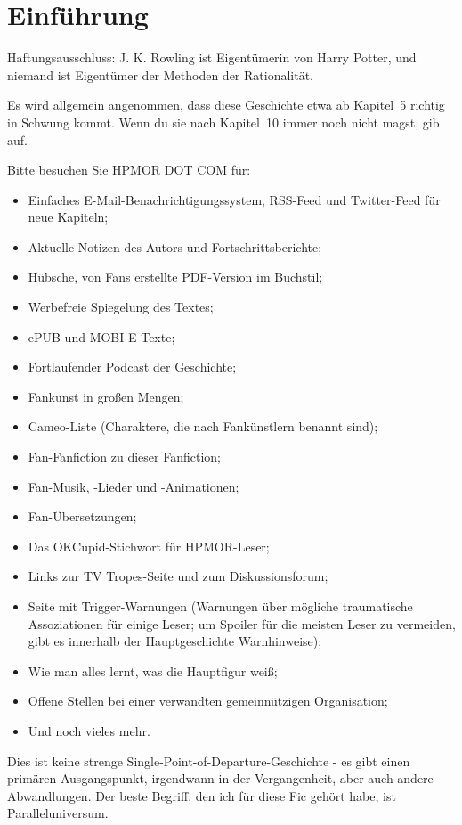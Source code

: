 \chapter{Einführung}
Haftungsausschluss: J. K. Rowling ist Eigentümerin von Harry Potter, und niemand
ist Eigentümer der Methoden der Rationalität.

Es wird allgemein angenommen, dass diese Geschichte etwa ab Kapitel~5 richtig in
Schwung kommt. Wenn du sie nach Kapitel~10 immer noch nicht magst, gib auf.

\SmallVSpace Bitte besuchen Sie HPMOR DOT COM für:

\SmallVSpace
\begin{itemize}
    \item Einfaches E-Mail-Benachrichtigungssystem, RSS-Feed und Twitter-Feed
    für neue Kapiteln;
    \item Aktuelle Notizen des Autors und Fortschrittsberichte;
    \item Hübsche, von Fans erstellte PDF-Version im Buchstil;
    \item Werbefreie Spiegelung des Textes;
    \item ePUB und MOBI E-Texte;
    \item Fortlaufender Podcast der Geschichte;
    \item Fankunst in großen Mengen;
    \item Cameo-Liste (Charaktere, die nach Fankünstlern benannt sind);
    \item Fan-Fanfiction zu dieser Fanfiction;
    \item Fan-Musik, -Lieder und -Animationen;
    \item Fan-Übersetzungen;
    \item Das OKCupid-Stichwort für HPMOR-Leser;
    \item Links zur TV Tropes-Seite und zum Diskussionsforum;
    \item Seite mit Trigger-Warnungen (Warnungen über mögliche traumatische
    Assoziationen für einige Leser; um Spoiler für die meisten Leser zu
    vermeiden, gibt es innerhalb der Hauptgeschichte Warnhinweise);
    \item Wie man alles lernt, was die Hauptfigur weiß;
    \item Offene Stellen bei einer verwandten gemeinnützigen Organisation;
    \item Und noch vieles mehr.
\end{itemize}

Dies ist keine strenge \glqq Single-Point-of-Departure\grqq{}-Geschichte - es gibt einen
primären Ausgangspunkt, irgendwann in der Vergangenheit, aber auch andere
Abwandlungen. Der beste Begriff, den ich für diese Fic gehört habe, ist
\glqq Paralleluniversum\grqq{}.

